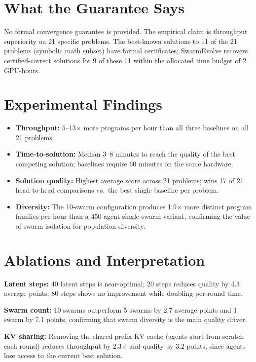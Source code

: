 \documentclass[10pt,twocolumn]{article}
\begin{document}
\section{What the Guarantee Says}

No formal convergence guarantee is provided. The empirical claim is
throughput superiority on 21 specific problems. The best-known
solutions to 11 of the 21 problems (symbolic math subset) have formal
certificates; SwarmEvolve recovers certified-correct solutions for 9 of
these 11 within the allocated time budget of 2 GPU-hours.

\section{Experimental Findings}

\begin{itemize}[itemsep=2pt,parsep=0pt]
  \item \textbf{Throughput:} 5--13$\times$ more programs per hour than
    all three baselines on all 21 problems.
  \item \textbf{Time-to-solution:} Median 3--8 minutes to reach the
    quality of the best competing solution; baselines require 60 minutes
    on the same hardware.
  \item \textbf{Solution quality:} Highest average score across 21
    problems; wins 17 of 21 head-to-head comparisons vs.\ the best
    single baseline per problem.
  \item \textbf{Diversity:} The 10-swarm configuration produces
    1.9$\times$ more distinct program families per hour than a
    450-agent single-swarm variant, confirming the value of swarm
    isolation for population diversity.
\end{itemize}

\section{Ablations and Interpretation}

\textbf{Latent steps:} 40 latent steps is near-optimal; 20 steps
reduces quality by 4.3 average points; 80 steps shows no improvement
while doubling per-round time.

\textbf{Swarm count:} 10 swarms outperform 5 swarms by 2.7 average
points and 1 swarm by 7.1 points, confirming that swarm diversity is
the main quality driver.

\textbf{KV sharing:} Removing the shared prefix KV cache (agents start
from scratch each round) reduces throughput by 2.3$\times$ and quality
by 3.2 points, since agents lose access to the current best solution.
\end{document}
